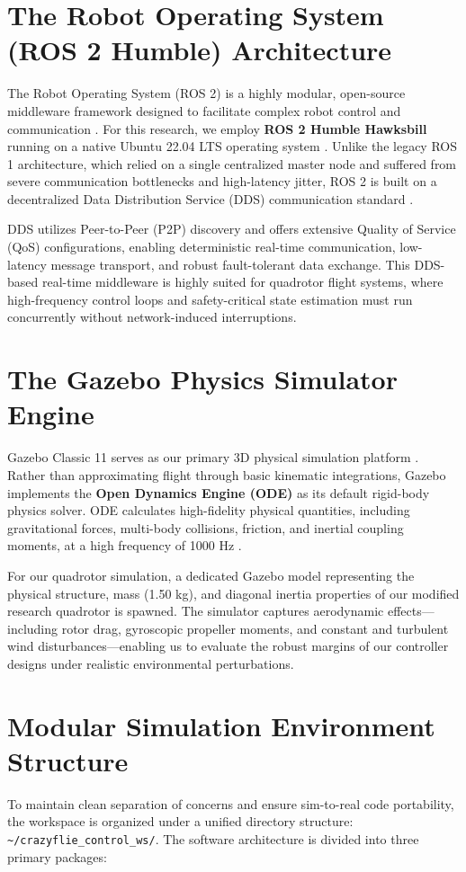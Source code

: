 \section{The Robot Operating System (ROS 2 Humble) Architecture}
The Robot Operating System (ROS 2) is a highly modular, open-source middleware framework designed to facilitate complex robot control and communication \cite{ref_89, ref_91}. For this research, we employ \textbf{ROS 2 Humble Hawksbill} running on a native Ubuntu 22.04 LTS operating system \cite{ref_89}. Unlike the legacy ROS 1 architecture, which relied on a single centralized master node and suffered from severe communication bottlenecks and high-latency jitter, ROS 2 is built on a decentralized Data Distribution Service (DDS) communication standard \cite{ref_91}. 

DDS utilizes Peer-to-Peer (P2P) discovery and offers extensive Quality of Service (QoS) configurations, enabling deterministic real-time communication, low-latency message transport, and robust fault-tolerant data exchange. This DDS-based real-time middleware is highly suited for quadrotor flight systems, where high-frequency control loops and safety-critical state estimation must run concurrently without network-induced interruptions.

\section{The Gazebo Physics Simulator Engine}
Gazebo Classic 11 serves as our primary 3D physical simulation platform \cite{ref_90}. Rather than approximating flight through basic kinematic integrations, Gazebo implements the \textbf{Open Dynamics Engine (ODE)} as its default rigid-body physics solver. ODE calculates high-fidelity physical quantities, including gravitational forces, multi-body collisions, friction, and inertial coupling moments, at a high frequency of 1000 Hz \cite{ref_90}. 

For our quadrotor simulation, a dedicated Gazebo model representing the physical structure, mass (1.50 kg), and diagonal inertia properties of our modified research quadrotor is spawned. The simulator captures aerodynamic effects—including rotor drag, gyroscopic propeller moments, and constant and turbulent wind disturbances—enabling us to evaluate the robust margins of our controller designs under realistic environmental perturbations.

\section{Modular Simulation Environment Structure}
To maintain clean separation of concerns and ensure sim-to-real code portability, the workspace is organized under a unified directory structure: \texttt{\textasciitilde/crazyflie\_control\_ws/}. The software architecture is divided into three primary packages:

